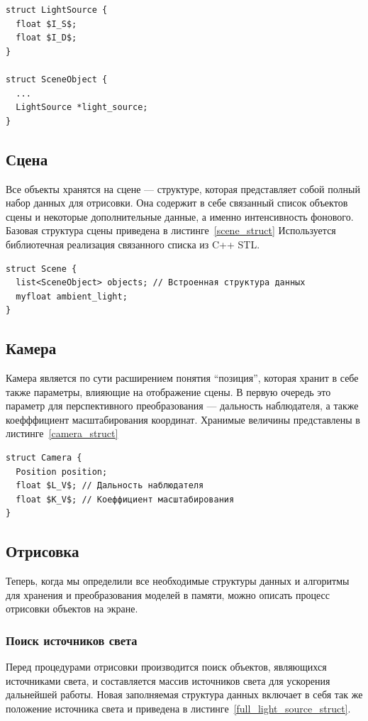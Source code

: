 \documentclass[a4paper,12pt]{report}
\numberwithin{equation}{section}
\begin{document}
\begin{lstlisting}[float=p,caption={Структура ``Источник света''},label=light_source_struct]
struct LightSource {
  float $I_S$;
  float $I_D$;
}

struct SceneObject {
  ...
  LightSource *light_source;
}
\end{lstlisting}

\subsection{Сцена}
Все объекты хранятся на сцене --- структуре, которая представляет собой полный набор данных для отрисовки. Она содержит в себе связанный список объектов сцены и некоторые дополнительные данные, а именно интенсивность фонового. Базовая структура сцены приведена в листинге~\ref{scene_struct} Используется библиотечная реализация связанного списка из C++ STL.

\begin{lstlisting}[float=p,caption={Структура ``Сцена''},label=scene_struct]
struct Scene {
  list<SceneObject> objects; // Встроенная структура данных
  myfloat ambient_light;
}
\end{lstlisting}

\subsection{Камера}
Камера является по сути расширением понятия ``позиция'', которая хранит в себе также параметры, влияющие на отображение сцены. В первую очередь это параметр для перспективного преобразования --- дальность наблюдателя, а также коефффициент масштабирования координат. Хранимые величины представлены в листинге~\ref{camera_struct}

\begin{lstlisting}[float=p,caption={Структура ``Камера''},label=camera_struct]
struct Camera {
  Position position;
  float $L_V$; // Дальность наблюдателя
  float $K_V$; // Коеффициент масштабирования
}
\end{lstlisting}

\subsection{Отрисовка}
Теперь, когда мы определили все необходимые структуры данных и алгоритмы для хранения и преобразования моделей в памяти, можно описать процесс отрисовки объектов на экране.

\subsubsection{Поиск источников света}
Перед процедурами отрисовки производится поиск объектов, являющихся источниками света, и составляется массив источников света для ускорения дальнейшей работы. Новая заполняемая структура данных включает в себя так же положение источника света и приведена в листинге~\ref{full_light_source_struct}.
\end{document}

